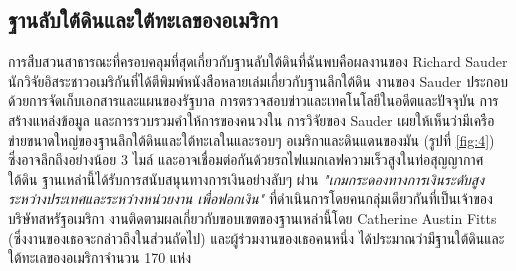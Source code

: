 \documentclass[10pt,twocolumn,letterpaper]{article}
\begin{document}
\subsection{ฐานลับใต้ดินและใต้ทะเลของอเมริกา}

การสืบสวนสาธารณะที่ครอบคลุมที่สุดเกี่ยวกับฐานลับใต้ดินที่ฉันพบคือผลงานของ Richard Sauder นักวิจัยอิสระชาวอเมริกันที่ได้ตีพิมพ์หนังสือหลายเล่มเกี่ยวกับฐานลึกใต้ดิน \cite{22} งานของ Sauder ประกอบด้วยการจัดเก็บเอกสารและแผนของรัฐบาล การตรวจสอบข่าวและเทคโนโลยีในอดีตและปัจจุบัน การสร้างแหล่งข้อมูล และการรวบรวมคำให้การของคนวงใน การวิจัยของ Sauder เผยให้เห็นว่ามีเครือข่ายขนาดใหญ่ของฐานลึกใต้ดินและใต้ทะเลในและรอบๆ อเมริกาและดินแดนของมัน (รูปที่ \ref{fig:4}) ซึ่งอาจลึกถึงอย่างน้อย 3 ไมล์ และอาจเชื่อมต่อกันด้วยรถไฟแมกเลฟความเร็วสูงในท่อสุญญากาศใต้ดิน ฐานเหล่านี้ได้รับการสนับสนุนทางการเงินอย่างลับๆ ผ่าน \textit{"เกมกระดองทางการเงินระดับสูงระหว่างประเทศและระหว่างหน่วยงาน เพื่อฟอกเงิน"} ที่ดำเนินการโดยคนกลุ่มเดียวกันที่เป็นเจ้าของบริษัทสหรัฐอเมริกา \cite{22} งานติดตามผลเกี่ยวกับขอบเขตของฐานเหล่านี้โดย Catherine Austin Fitts (ซึ่งงานของเธอจะกล่าวถึงในส่วนถัดไป) และผู้ร่วมงานของเธอคนหนึ่ง ได้ประมาณว่ามีฐานใต้ดินและใต้ทะเลของอเมริกาจำนวน 170 แห่ง \cite{16,20}
\end{document}
